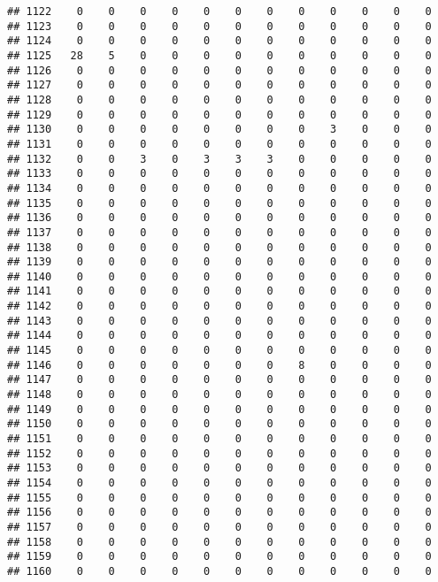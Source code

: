 \documentclass[]{article}
\begin{document}
\begin{verbatim}
## 1122    0    0    0    0    0    0    0    0    0    0    0    0
## 1123    0    0    0    0    0    0    0    0    0    0    0    0
## 1124    0    0    0    0    0    0    0    0    0    0    0    0
## 1125   28    5    0    0    0    0    0    0    0    0    0    0
## 1126    0    0    0    0    0    0    0    0    0    0    0    0
## 1127    0    0    0    0    0    0    0    0    0    0    0    0
## 1128    0    0    0    0    0    0    0    0    0    0    0    0
## 1129    0    0    0    0    0    0    0    0    0    0    0    0
## 1130    0    0    0    0    0    0    0    0    3    0    0    0
## 1131    0    0    0    0    0    0    0    0    0    0    0    0
## 1132    0    0    3    0    3    3    3    0    0    0    0    0
## 1133    0    0    0    0    0    0    0    0    0    0    0    0
## 1134    0    0    0    0    0    0    0    0    0    0    0    0
## 1135    0    0    0    0    0    0    0    0    0    0    0    0
## 1136    0    0    0    0    0    0    0    0    0    0    0    0
## 1137    0    0    0    0    0    0    0    0    0    0    0    0
## 1138    0    0    0    0    0    0    0    0    0    0    0    0
## 1139    0    0    0    0    0    0    0    0    0    0    0    0
## 1140    0    0    0    0    0    0    0    0    0    0    0    0
## 1141    0    0    0    0    0    0    0    0    0    0    0    0
## 1142    0    0    0    0    0    0    0    0    0    0    0    0
## 1143    0    0    0    0    0    0    0    0    0    0    0    0
## 1144    0    0    0    0    0    0    0    0    0    0    0    0
## 1145    0    0    0    0    0    0    0    0    0    0    0    0
## 1146    0    0    0    0    0    0    0    8    0    0    0    0
## 1147    0    0    0    0    0    0    0    0    0    0    0    0
## 1148    0    0    0    0    0    0    0    0    0    0    0    0
## 1149    0    0    0    0    0    0    0    0    0    0    0    0
## 1150    0    0    0    0    0    0    0    0    0    0    0    0
## 1151    0    0    0    0    0    0    0    0    0    0    0    0
## 1152    0    0    0    0    0    0    0    0    0    0    0    0
## 1153    0    0    0    0    0    0    0    0    0    0    0    0
## 1154    0    0    0    0    0    0    0    0    0    0    0    0
## 1155    0    0    0    0    0    0    0    0    0    0    0    0
## 1156    0    0    0    0    0    0    0    0    0    0    0    0
## 1157    0    0    0    0    0    0    0    0    0    0    0    0
## 1158    0    0    0    0    0    0    0    0    0    0    0    0
## 1159    0    0    0    0    0    0    0    0    0    0    0    0
## 1160    0    0    0    0    0    0    0    0    0    0    0    0

\end{verbatim}
\end{document}
